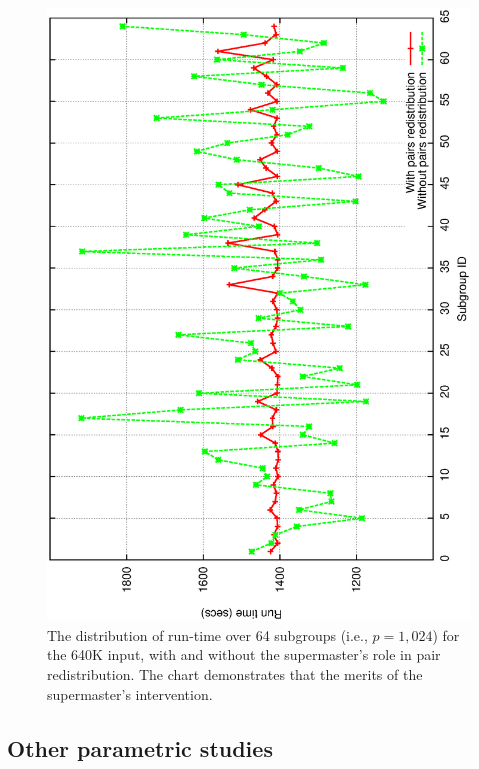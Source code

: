 \documentclass[10pt,journal,letterpaper,compsoc]{IEEEtran}
\begin{document}
\begin{figure}[h]
\centerline{
            \includegraphics[angle=-90, scale=0.33]{subgroups.eps}
}
\caption{
The distribution of run-time over 64 subgroups (i.e., $p=1,024$) for the 640K input, with and without the supermaster's role in pair redistribution. The chart demonstrates that the merits of the supermaster's intervention.
}
\label{figSPvalue}
\end{figure}

\newpage



\subsection{Other parametric studies}
\label{secParameters}
\end{document}
